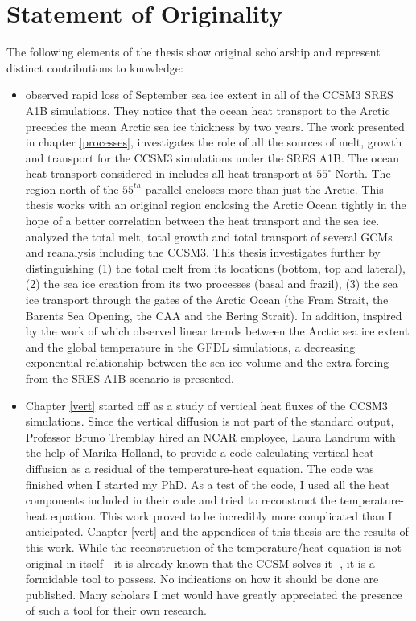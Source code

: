 \section*{Statement of Originality}
The following elements of the thesis show original scholarship and represent distinct
contributions to knowledge:
\begin{itemize}
\item \cite{ISI:000242942100008} observed rapid loss of September sea ice extent in all of the CCSM3 SRES A1B simulations. They notice that the ocean heat transport to the Arctic precedes the mean Arctic sea ice thickness by two years. The work presented in chapter \ref{processes}, investigates the role of all the sources of melt, growth and transport for the CCSM3 simulations under the SRES A1B. The ocean heat transport considered in \cite{ISI:000242942100008} includes all heat transport at $55^\circ$ North. The region north of the  $55^{th}$ parallel encloses more than just the Arctic. This thesis works with an original region enclosing the Arctic Ocean tightly in the hope of a better correlation between the heat transport  and the sea ice. \cite{Holland2010} analyzed the total melt, total growth and total transport of several GCMs and reanalysis including the CCSM3. This thesis investigates further by distinguishing (1) the total melt from its locations (bottom, top and lateral), (2)  the sea ice creation from its two processes (basal and frazil), (3) the sea ice transport through the gates of the Arctic Ocean (the Fram Strait, the Barents Sea Opening, the CAA and the Bering Strait). In addition, inspired by the work of \cite{winton2011} which observed linear trends between the Arctic sea ice extent and the global temperature in the GFDL simulations, a decreasing exponential relationship between the sea ice volume and the extra forcing from the SRES A1B scenario is presented. 


\item Chapter \ref{vert} started off as a study of vertical heat fluxes of the CCSM3 simulations. Since the vertical diffusion is not part of the standard output, Professor Bruno Tremblay hired an NCAR employee, Laura Landrum with the help of Marika Holland, to provide a code calculating vertical heat diffusion as a residual of the temperature-heat equation. The code was finished when I started my PhD. As a test of the code, I used all the heat components included in their code and tried to reconstruct the temperature-heat equation. This work proved to be incredibly more complicated than I anticipated. Chapter \ref{vert} and the appendices of this thesis are the results of this work. While the reconstruction of the temperature/heat equation is not original in itself - it is already known that the CCSM solves it -, it is a formidable tool to possess. No indications on how it should be done are published. Many scholars I met would have greatly appreciated the presence of such a tool for their own research. 



\end{itemize}
